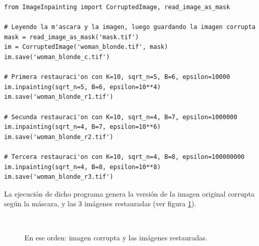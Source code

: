 \begin{lstlisting}
from ImageInpainting import CorruptedImage, read_image_as_mask

# Leyendo la m'ascara y la imagen, luego guardando la imagen corrupta
mask = read_image_as_mask('mask.tif')
im = CorruptedImage('woman_blonde.tif', mask)
im.save('woman_blonde_c.tif')

# Primera restauraci'on con K=10, sqrt_n=5, B=6, epsilon=10000 
im.inpainting(sqrt_n=5, B=6, epsilon=10**4)
im.save('woman_blonde_r1.tif')

# Secunda restauraci'on con K=10, sqrt_n=4, B=7, epsilon=1000000
im.inpainting(sqrt_n=4, B=7, epsilon=10**6)
im.save('woman_blonde_r2.tif')

# Tercera restauraci'on con K=10, sqrt_n=4, B=8, epsilon=100000000 
im.inpainting(sqrt_n=4, B=8, epsilon=10**8)
im.save('woman_blonde_r3.tif')
\end{lstlisting}
La ejecuci\'on de dicho programa genera la versi\'on de la imagen original corrupta seg\'un la m\'ascara, y las 3 im\'agenes restauradas (ver figura \ref{fig:inpainting_woman_blonde}).
\begin{figure}[H]
	\centering
	\\
	\caption{En ese orden: imagen corrupta y las im\'agenes restauradas.}
	\label{fig:inpainting_woman_blonde}
\end{figure}
